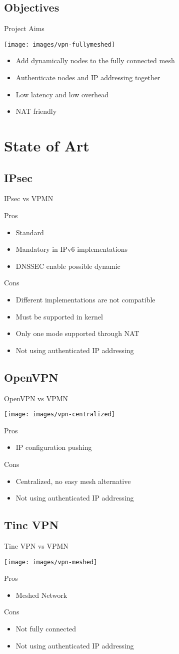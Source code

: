 \documentclass{beamer}
\newcommand*{\comparativeframe}[5]{
\begin{frame}{#1}
	#2
	\begin{exampleblock}{Pros}
		\begin{itemize}
		#3
		\end{itemize}
	\end{exampleblock}
	\begin{alertblock}{Cons}
		\begin{itemize}
		#4
		\end{itemize}
	\end{alertblock}
	#5
\end{frame}
}
\begin{document}
\subsection*{Objectives}
\begin{frame}{Project Aims}
	\begin{center}
	\texttt{[image: images/vpn-fullymeshed]}
	\end{center}
	\begin{itemize}
	\item Add dynamically nodes to the fully connected mesh
	\item Authenticate nodes and IP addressing together
	\item Low latency and low overhead
	\item NAT friendly
	\end{itemize}
\end{frame}

\section{State of Art}
\subsection{IPsec}
\comparativeframe{IPsec vs VPMN}{}
{%
\item Standard
\item Mandatory in IPv6 implementations
\item DNSSEC enable possible dynamic
}{%
\item Different implementations are \alert{not compatible}
\item Must be supported in kernel
\item Only one mode supported through NAT
\item Not using authenticated IP addressing
}{}
\subsection{OpenVPN}
\comparativeframe{OpenVPN vs VPMN}
{\begin{center}
\texttt{[image: images/vpn-centralized]}
\end{center}}
{%
\item IP configuration pushing
}{%
\item Centralized, no easy mesh alternative
\item Not using authenticated IP addressing
}{}
\subsection{Tinc VPN}
\comparativeframe{Tinc VPN vs VPMN}
{\begin{center}
\texttt{[image: images/vpn-meshed]}
\end{center}}
{%
\item Meshed Network
}{%
\item Not fully connected
\item Not using authenticated IP addressing
}{}
\end{document}
